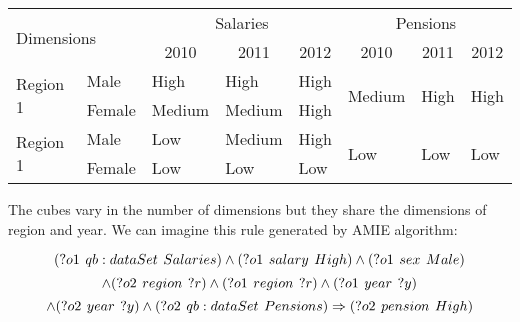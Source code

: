 \begin{table}[h]
\centering
\begin{tabular}{ll|lll|lll}
\multicolumn{2}{l|}{\multirow{2}{*}{Dimensions}} & \multicolumn{3}{c|}{Salaries}                                                   & \multicolumn{3}{c}{Pensions}                                                    \\
\multicolumn{2}{l|}{}                            & \multicolumn{1}{c}{2010} & \multicolumn{1}{c}{2011} & \multicolumn{1}{c|}{2012} & \multicolumn{1}{c}{2010} & \multicolumn{1}{c}{2011} & \multicolumn{1}{c}{2012}  \\ 
\hline
\multirow{2}{*}{Region 1} & Male                 & High                     & High                     & High                      & \multirow{2}{*}{Medium}  & \multirow{2}{*}{High}    & \multirow{2}{*}{High}     \\
                          & Female               & Medium                   & Medium                   & High                     &                          &                          &                           \\
\multirow{2}{*}{Region 1} & Male                 & Low                      & Medium                   & High                      & \multirow{2}{*}{Low}     & \multirow{2}{*}{Low}     & \multirow{2}{*}{Low}      \\
                          & Female               & Low                      & Low                      & Low                       &                          &                          &                          
\end{tabular}
\end{table}

The cubes vary in the number of dimensions but they share the dimensions of region and year. We can imagine this rule generated by AMIE algorithm:

$$
(?o1\hspace{0.4em}qb:dataSet\hspace{0.4em}Salaries) \land (?o1\hspace{0.4em}salary\hspace{0.4em}High) \land (?o1\hspace{0.4em}sex\hspace{0.4em}Male)
$$
$$
\land (?o2\hspace{0.4em}region\hspace{0.4em}?r) \land (?o1\hspace{0.4em}region\hspace{0.4em}?r) \land (?o1\hspace{0.4em}year\hspace{0.4em}?y)
$$
$$
\land (?o2\hspace{0.4em}year\hspace{0.4em}?y) \land (?o2\hspace{0.4em}qb:dataSet\hspace{0.4em}Pensions) \Rightarrow (?o2\hspace{0.4em}pension\hspace{0.4em}High)
$$

